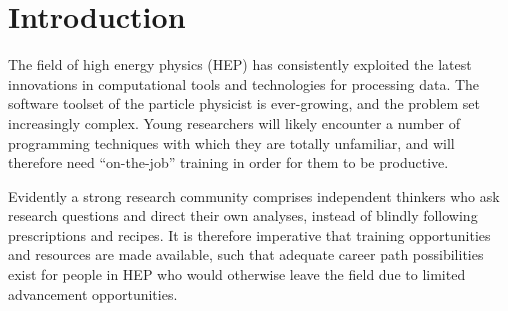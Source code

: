 \documentclass[12pt,a4paper]{article}
\begin{document}
%
%
%
%



\section{Introduction}

The field of high energy physics (HEP) has consistently exploited 
the latest innovations in computational tools and technologies for processing data.
The software toolset of the particle physicist is ever-growing, and the problem
set increasingly complex. Young researchers will likely encounter a number of 
programming techniques with which they are totally unfamiliar, and will therefore 
need ``on-the-job'' training in order for them to be productive.

Evidently a strong research community comprises independent thinkers who ask
research questions and direct their own analyses, instead of blindly following
prescriptions and recipes. It is therefore imperative that training opportunities 
and resources are made available, such that adequate career
path possibilities exist for people in HEP who would otherwise leave the field
due to limited advancement opportunities.
\end{document}
